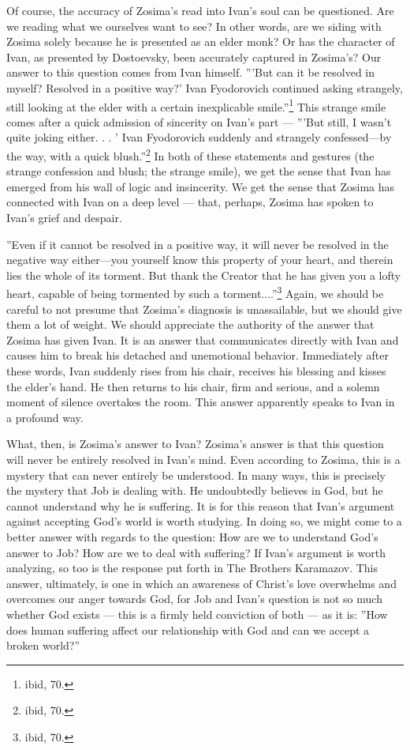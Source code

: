 Of course, the accuracy of Zosima's read into Ivan's soul can be questioned. Are we reading what we ourselves want to see? In other words, are we siding with Zosima solely because he is presented as an elder monk? Or has the character of Ivan, as presented by Dostoevsky, been accurately captured in Zosima's? Our answer to this question comes from Ivan himself. '''But can it be resolved in myself? Resolved in a positive way?' Ivan Fyodorovich continued asking strangely, still looking at the elder with a certain inexplicable smile.''\footnote{ibid, 70.} This strange smile comes after a quick admission of sincerity on Ivan's part --- '''But still, I wasn't quite joking either. . . ' Ivan Fyodorovich suddenly and strangely confessed---by the way, with a quick blush.''\footnote{ibid, 70.} In both of these statements and gestures (the strange confession and blush; the strange smile), we get the sense that Ivan has emerged from his wall of logic and insincerity. We get the sense that Zosima has connected with Ivan on a deep level --- that, perhaps, Zosima has spoken to Ivan's grief and despair.

''Even if it cannot be resolved in a positive way, it will never be resolved in the negative way either---you yourself know this property of your heart, and therein lies the whole of its torment. But thank the Creator that he has given you a lofty heart, capable of being tormented by such a torment....''\footnote{ibid, 70.} Again, we should be careful to not presume that Zosima's diagnosis is unassailable, but we should give them a lot of weight. We should appreciate the authority of the answer that Zosima has given Ivan. It is an answer that communicates directly with Ivan and causes him to break his detached and unemotional behavior. Immediately after these words, Ivan suddenly rises from his chair, receives his blessing and kisses the elder's hand. He then returns to his chair, firm and serious, and a solemn moment of silence overtakes the room. This answer apparently speaks to Ivan in a profound way.

What, then, is Zosima's answer to Ivan? Zosima's answer is that this question will never be entirely resolved in Ivan's mind. Even according to Zosima, this is a mystery that can never entirely be understood. In many ways, this is precisely the mystery that Job is dealing with. He undoubtedly believes in God, but he cannot understand why he is suffering. It is for this reason that Ivan's argument against accepting God's world is worth studying. In doing so, we might come to a better answer with regards to the question: How are we to understand God's answer to Job? How are we to deal with suffering? If Ivan's argument is worth analyzing, so too is the response put forth in The Brothers Karamazov. This answer, ultimately, is one in which an awareness of Christ's love overwhelms and overcomes our anger towards God, for Job and Ivan's question is not so much whether God exists --- this is a firmly held conviction of both --- as it is: ''How does human suffering affect our relationship with God and can we accept a broken world?''        

